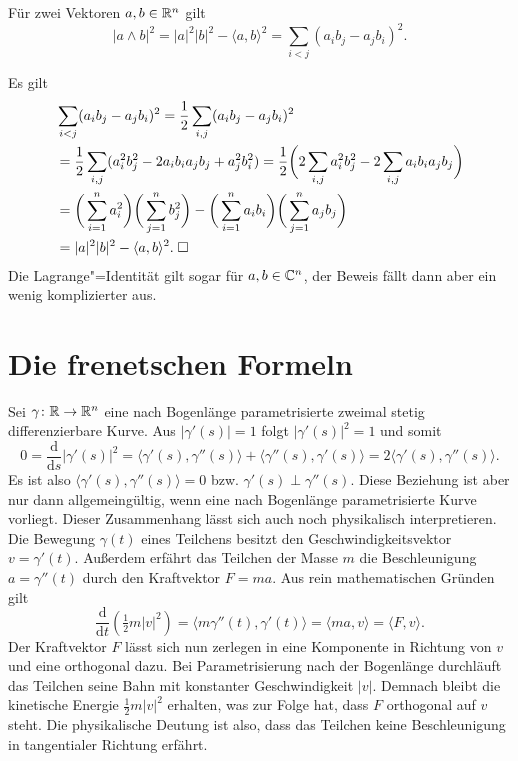 \begin{theorem}
Für zwei Vektoren $a,b\in\mathbb R^n$ gilt
\begin{equation}
|a\wedge b|^2 = |a|^2 |b|^2 - \langle a,b\rangle^2
= \sum_{i<j} (a_i b_j - a_j b_i)^2.
\end{equation}
\end{theorem}
Es gilt
\begin{align}
&\sum_{i<j} (a_i b_j - a_j b_i)^2
= \frac{1}{2}\sum_{i,j} (a_i b_j - a_j b_i)^2\\
&= \frac{1}{2}\sum_{i,j} (a_i^2 b_j^2 - 2a_i b_i a_j b_j + a_j^2 b_i^2)
= \frac{1}{2}\bigg(2\sum_{i,j} a_i^2 b_j^2 - 2\sum_{i,j}a_i b_i a_j b_j\bigg)\\
&= \bigg(\sum_{i=1}^n a_i^2\bigg)\bigg(\sum_{j=1}^n b_j^2\bigg)
- \bigg(\sum_{i=1}^n a_i b_i\bigg)\bigg(\sum_{j=1}^n a_j b_j\bigg)\\
&= |a|^2 |b|^2 - \langle a,b\rangle^2.\;\Box
\end{align}
Die Lagrange"=Identität gilt sogar für $a,b\in\mathbb C^n$, der Beweis
fällt dann aber ein wenig komplizierter aus.

\section{Die frenetschen Formeln}

Sei $\gamma\colon\mathbb R\to\mathbb R^n$ eine nach Bogenlänge parametrisierte
zweimal stetig differenzierbare Kurve. Aus $|\gamma'(s)|=1$ folgt
$|\gamma'(s)|^2=1$ und somit%
\begin{equation}\label{eq:orthogonale-Ableitungen}
0 = \frac{\mathrm d}{\mathrm ds} |\gamma'(s)|^2
= \langle \gamma'(s),\gamma''(s)\rangle + \langle\gamma''(s),\gamma'(s)\rangle
= 2\langle\gamma'(s),\gamma''(s)\rangle.
\end{equation}
Es ist also $\langle\gamma'(s),\gamma''(s)\rangle=0$
bzw. $\gamma'(s)\perp\gamma''(s)$. Diese Beziehung ist aber nur dann
allgemeingültig, wenn eine nach Bogenlänge parametrisierte Kurve
vorliegt. Dieser Zusammenhang lässt sich auch noch physikalisch
interpretieren. Die Bewegung $\gamma(t)$ eines Teilchens besitzt den
Geschwindigkeitsvektor $v=\gamma'(t)$. Außerdem erfährt das Teilchen
der Masse $m$ die Beschleunigung $a=\gamma''(t)$ durch den
Kraftvektor $F=ma$. Aus rein mathematischen Gründen gilt%
\begin{equation}
\frac{\mathrm d}{\mathrm dt}(\tfrac{1}{2}m |v|^2)
= \langle m\gamma''(t),\gamma'(t)\rangle = \langle ma,v\rangle
= \langle F,v\rangle.
\end{equation}
Der Kraftvektor $F$ lässt sich nun zerlegen in eine Komponente in
Richtung von $v$ und eine orthogonal dazu. Bei Parametrisierung
nach der Bogenlänge durchläuft das Teilchen seine Bahn mit konstanter
Geschwindigkeit $|v|$. Demnach bleibt die kinetische Energie
$\tfrac{1}{2}m|v|^2$ erhalten,
was zur Folge hat, dass $F$ orthogonal auf $v$ steht. Die physikalische
Deutung ist also, dass das Teilchen keine Beschleunigung in
tangentialer Richtung erfährt.

